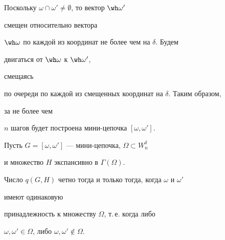  


\begin{pf} 


Поскольку $\omega\cap\omega'\ne\emptyset$, то вектор $\wh\omega'$ 


смещен относительно вектора 


$\wh\omega$ по каждой из координат не более чем на $\delta$. Будем 


двигаться от $\wh\omega$ к $\wh\omega'$, 


смещаясь 


по очереди по каждой из смещенных координат на $\delta$. Таким образом, 


за не более чем 


$n$ шагов будет построена мини-цепочка $[\omega,\omega']$. 


\end{pf} 


 


\begin{lem} 


Пусть $G=[\omega,\omega']$ --- мини-цепочка, $\Omega\subset W^\delta_n$ 


и множество $H$ экспансивно в $\Gamma(\Omega)$.


Число $q(G,H)$ четно тогда и только тогда, когда $\omega$ и $\omega'$ 


имеют одинаковую 


принадлежность к множеству $\Omega$, т.\,е. когда либо 


$\omega,\omega'\in\Omega$, либо $\omega,\omega'\notin\Omega$. 


\end{lem} 


 


